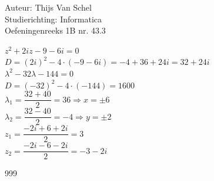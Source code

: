 \documentclass[a4paper]{article}
\begin{document}
  
\noindent \large Auteur: Thijs Van Schel \\
\noindent \large Studierichting: Informatica\\
\noindent \large Oefeningenreeks 1B nr. 43.3\\

\medskip

\normalsize

$z^2 + 2iz - 9 - 6i = 0$\\

$D= (2i)^2 - 4\cdot(-9-6i) = -4+36+24i = 32+24i$\\

$\lambda^2 - 32 \lambda - 144 = 0$\\

$D= (-32)^2-4 \cdot (-144) = 1600$\\

$\lambda_1 = \dfrac{32 + 40}{2} = 36 \Rightarrow x = \pm6$\\

$\lambda_2 = \dfrac{32 - 40}{2} = -4 \Rightarrow y = \pm2$\\

$z_1 = \dfrac{-2i+6+2i}{2} = 3$\\

$z_2 = \dfrac{-2i-6-2i}{2} = -3-2i$\\
\begin{thebibliography}{999}
\end{thebibliography}
\end{document}
